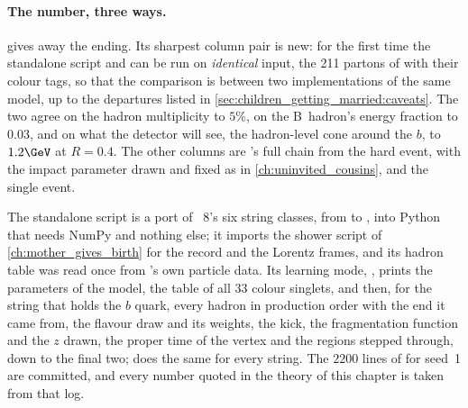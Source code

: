 \paragraph{The number, three ways.}
\label{sec:children_getting_married:validation}
\label{sec:children_getting_married:standalone_code}
 gives away the ending. Its
sharpest column pair is new: for the first time the standalone script and
\PYTHIA can be run on \emph{identical} input, the 211 partons of
 with their colour tags, so that the comparison is
between two implementations of the same model, up to the departures
listed in \cref{sec:children_getting_married:caveats}. The two
agree on the hadron multiplicity to $5\%$, on the B~hadron's energy fraction
to $0.03$, and on what the detector will see, the hadron-level cone around
the $b$, to $1.2\GeV$ at $R=0.4$. The other columns are \PYTHIA's full chain
from the hard event, with the impact parameter drawn and fixed as in
\cref{ch:uninvited_cousins}, and the single \CMSSW event.

The standalone script is a port of \PYTHIA~8's six string classes, from
 to , into Python that
needs NumPy and nothing else; it imports the shower script of
\cref{ch:mother_gives_birth} for the record and the Lorentz frames, and its
hadron table was read once from \PYTHIA's own particle data. Its learning
mode, , prints the parameters of the model, the table of all $33$
colour singlets, and then, for the string that holds the $b$ quark, every
hadron in production order with the end it came from, the flavour draw and
its weights, the \pt kick, the fragmentation function and the $z$ drawn,
the proper time of the vertex and the regions stepped through, down to the
final two;  does the same for every string. The $2200$ lines of
 for seed~1 are committed, and every number quoted in the theory
of this chapter is taken from that log.
\label{sec:children_getting_married:pythia}

